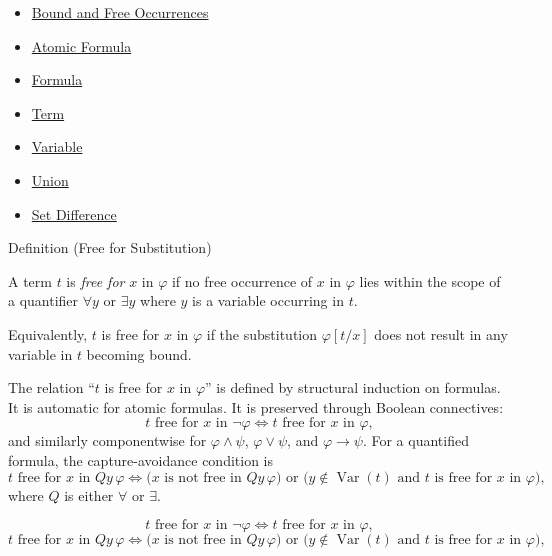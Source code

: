 \begin{dependencies}
\begin{itemize}
  \item \hyperref[def:bound-free]{Bound and Free Occurrences}
  \item \hyperref[def:atomic-formula]{Atomic Formula}
  \item \hyperref[def:formula]{Formula}
  \item \hyperref[def:term]{Term}
  \item \hyperref[def:variable]{Variable}
  \item \hyperref[def:union]{Union}
  \item \hyperref[def:set-difference]{Set Difference}
\end{itemize}
\end{dependencies}

\begin{definitionbox}{Definition (Free for Substitution)}
\begin{definition}
\label{def:free-for}
A term $t$ is \emph{free for} $x$ in $\varphi$ if no free occurrence of $x$ in
$\varphi$ lies within the scope of a quantifier $\forall y$ or $\exists y$
where $y$ is a variable occurring in $t$.

Equivalently, $t$ is free for $x$ in $\varphi$ if the substitution $\varphi[t/x]$
does not result in any variable in $t$ becoming bound.
\end{definition}
\end{definitionbox}
\begin{remark*}
The relation ``$t$ is free for $x$ in $\varphi$'' is defined by structural
induction on formulas. It is automatic for atomic formulas. It is preserved
through Boolean connectives:
\[
  t\text{ free for }x\text{ in }\neg\varphi
  \iff
  t\text{ free for }x\text{ in }\varphi,
\]
and similarly componentwise for $\varphi\land\psi$, $\varphi\lor\psi$, and
$\varphi\to\psi$. For a quantified formula, the capture-avoidance condition is
\[
  t\text{ free for }x\text{ in }Qy\,\varphi
  \iff
  \bigl(x\text{ is not free in }Qy\,\varphi\bigr)
  \text{ or }
  \bigl(y\notin\operatorname{Var}(t)
    \text{ and }t\text{ is free for }x\text{ in }\varphi\bigr),
\]
where $Q$ is either $\forall$ or $\exists$.
\end{remark*}

\begin{remark*}
\[
t\text{ free for }x\text{ in }\neg\varphi
  \iff
  t\text{ free for }x\text{ in }\varphi,
\]
\[
t\text{ free for }x\text{ in }Qy\,\varphi
  \iff
  \bigl(x\text{ is not free in }Qy\,\varphi\bigr)
  \text{ or }
  \bigl(y\notin\operatorname{Var}(t)
    \text{ and }t\text{ is free for }x\text{ in }\varphi\bigr),
\]
\end{remark*}



